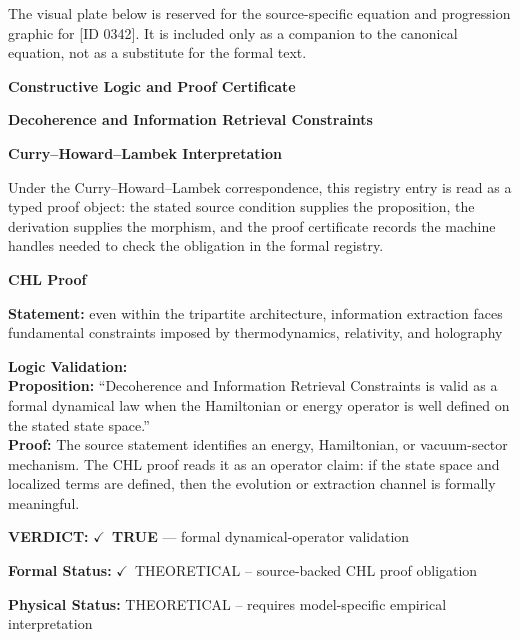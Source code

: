 \begingroup\footnotesize\sloppy
The visual plate below is reserved for the source-specific equation and progression graphic for [ID 0342]. It is included only as a companion to the canonical equation, not as a substitute for the formal text.
\par\endgroup
\ifTZPDarkEdition
{}
\fi

\clearpage
\begingroup\tzpsupportsetup
\noindent\textbf{\fontsize{10.8pt}{12.8pt}\selectfont [ID 0342] Constructive Logic and Proof Certificate}\par
\noindent\textbf{\fontsize{10pt}{12pt}\selectfont Decoherence and Information Retrieval Constraints}\par
\vspace{0.45em}
\begingroup
\footnotesize
\setlength{\parskip}{0.22em}
\setlength{\parindent}{0pt}
\noindent\textbf{Curry--Howard--Lambek Interpretation}\par
Under the Curry--Howard--Lambek correspondence, this registry entry is read as a typed proof
object: the stated source condition supplies the proposition, the derivation supplies the
morphism, and the proof certificate records the machine handles needed to check the obligation
in the formal registry.

\vspace{0.45em}
\noindent\textbf{CHL Proof}\par
\textbf{Statement:} even within the tripartite architecture, information extraction faces fundamental
constraints imposed by thermodynamics, relativity, and holography

\textbf{Logic Validation:}\\
\textbf{Proposition:} ``Decoherence and Information Retrieval Constraints is valid as a formal dynamical law
when the Hamiltonian or energy operator is well defined on the stated state space.''\\
\textbf{Proof:} The source statement identifies an energy, Hamiltonian, or vacuum-sector mechanism. The
CHL proof reads it as an operator claim: if the state space and localized terms are
defined, then the evolution or extraction channel is formally meaningful.

\textbf{VERDICT:} \ensuremath{\checkmark}\ \textbf{TRUE} --- formal dynamical-operator validation

\textbf{Formal Status:} \ensuremath{\checkmark}\ THEORETICAL -- source-backed CHL proof obligation

\textbf{Physical Status:} THEORETICAL -- requires model-specific empirical interpretation
\par\vspace{0.45em}
\par
\ifTZPDarkEdition
{}
\fi
\endgroup
\endgroup
